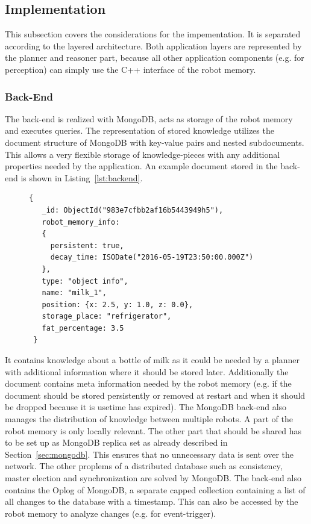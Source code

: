 \documentclass[a4paper,11pt]{article}
\newcommand{\refsec}[1]{Section~\ref{#1}}
\newcommand{\reflst}[1]{Listing~\ref{#1}}
\begin{document}
\subsection{Implementation}
\label{sec:impl}
This subsection covers the considerations for the impementation. It is
separated according to the layered architecture. Both application
layers are represented by the planner and reasoner part, because all
other application components (e.g. for perception) can simply use the
C++ interface of the robot memory.

\subsubsection{Back-End}
\label{sec:back-end}
The back-end is realized with MongoDB, acts as storage of the robot
memory and executes queries. The representation of stored knowledge
utilizes the document structure of MongoDB with key-value pairs and
nested subdocuments. This allows a very flexible storage of
knowledge-pieces with any additional properties needed by the
application. An example document stored in the back-end is shown in
\reflst{lst:backend}. 
\begin{figure}
\begin{lstlisting}[style=SmallJSON,
  caption={Representation of a knowledge piece in the back-end},
  label=lst:backend,
  framexleftmargin=15pt, xleftmargin=15pt,
 morekeywords={}]
 {
   _id: ObjectId("983e7cfbb2af16b5443949h5"),
   robot_memory_info:
   {
     persistent: true,
     decay_time: ISODate("2016-05-19T23:50:00.000Z")
   },
   type: "object info",
   name: "milk_1",
   position: {x: 2.5, y: 1.0, z: 0.0},
   storage_place: "refrigerator",
   fat_percentage: 3.5
 }
\end{lstlisting}
\end{figure}
It contains knowledge about a bottle of milk as it could be needed by
a planner with additional information where it should be stored
later. Additionally the document contains meta information needed by
the robot memory (e.g. if the document should be stored persistently
or removed at restart and when it should be dropped because it is
usetime has expired). The MongoDB back-end also manages the
distribution of knowledge between multiple robots. A part of the robot
memory is only locally relevant. The other part that should be shared
has to be set up as MongoDB replica set as already described in
\refsec{sec:mongodb}. This ensures that no unnecessary data is sent
over the network. The other proplems of a distributed database such as
consistency, master election and synchronization are solved by
MongoDB. The back-end also contains the Oplog of MongoDB, a separate
capped collection containing a list of all changes to the database
with a timestamp. This can also be accessed by the robot memory to
analyze changes (e.g. for event-trigger).
\end{document}
